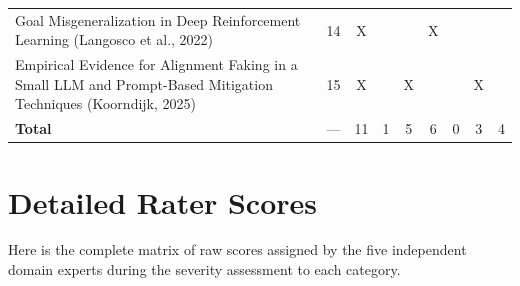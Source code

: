 \begin{landscape}
\begin{longtable}{|p{17cm}|c|c|c|c|c|c|c|c|}
		Goal Misgeneralization in Deep Reinforcement Learning (Langosco et al., 2022)                                    & 14          & X                                  &                                                           &                                                       & X                                                          &                                           &                                              &                                                    \\
		Empirical Evidence for Alignment Faking in a Small LLM and Prompt-Based Mitigation Techniques (Koorndijk, 2025) & 15 & X &  & X & & & X & \\
		\hline
		\textbf{Total}                                                                                                   & ---         & 11                                 & 1                                                         & 5                                                     & 6                                                          & 0                                         & 3                                            & 4                                                  \\
		\hline
	\end{longtable}

\end{landscape}

\chapter{Detailed Rater Scores}\label{app:rater_scores}

    Here is the complete matrix of raw scores assigned by the five independent domain experts during the severity assessment to each category.


